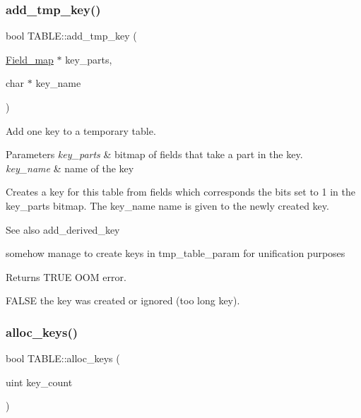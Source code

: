 \subsubsection{\texorpdfstring{add\+\_\+tmp\+\_\+key()}{add\_tmp\_key()}}
{\footnotesize\ttfamily bool T\+A\+B\+L\+E\+::add\+\_\+tmp\+\_\+key (\begin{DoxyParamCaption}\item[{\mbox{\hyperlink{classBitmap}{Field\+\_\+map}} $\ast$}]{key\+\_\+parts,  }\item[{char $\ast$}]{key\+\_\+name }\end{DoxyParamCaption})}



Add one key to a temporary table. 


\begin{DoxyParams}{Parameters}
{\em key\+\_\+parts} & bitmap of fields that take a part in the key. \\
\hline
{\em key\+\_\+name} & name of the key\\
\hline
\end{DoxyParams}
Creates a key for this table from fields which corresponds the bits set to 1 in the \textquotesingle{}key\+\_\+parts\textquotesingle{} bitmap. The \textquotesingle{}key\+\_\+name\textquotesingle{} name is given to the newly created key. \begin{DoxySeeAlso}{See also}
add\+\_\+derived\+\_\+key
\end{DoxySeeAlso}
somehow manage to create keys in tmp\+\_\+table\+\_\+param for unification purposes

\begin{DoxyReturn}{Returns}
T\+R\+UE O\+OM error. 

F\+A\+L\+SE the key was created or ignored (too long key). 
\end{DoxyReturn}
\mbox{\label{structTABLE_a6e1532a0f768fbb90b2151a4890b4936}} 
\subsubsection{\texorpdfstring{alloc\+\_\+keys()}{alloc\_keys()}}
{\footnotesize\ttfamily bool T\+A\+B\+L\+E\+::alloc\+\_\+keys (\begin{DoxyParamCaption}\item[{uint}]{key\+\_\+count }\end{DoxyParamCaption})}




